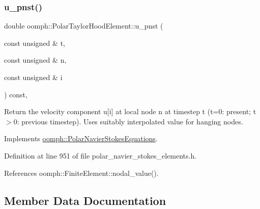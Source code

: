 \mbox{\label{classoomph_1_1PolarTaylorHoodElement_ad1faa74e287808e3a2ebc493d6e78686}} 
\subsubsection{\texorpdfstring{u\+\_\+pnst()}{u\_pnst()}\hspace{0.1cm}{\footnotesize\ttfamily [2/2]}}
{\footnotesize\ttfamily double oomph\+::\+Polar\+Taylor\+Hood\+Element\+::u\+\_\+pnst (\begin{DoxyParamCaption}\item[{const unsigned \&}]{t,  }\item[{const unsigned \&}]{n,  }\item[{const unsigned \&}]{i }\end{DoxyParamCaption}) const\hspace{0.3cm}{\ttfamily [inline]}, {\ttfamily [virtual]}}



Return the velocity component u\mbox{[}i\mbox{]} at local node n at timestep t (t=0\+: present; t$>$0\+: previous timestep). Uses suitably interpolated value for hanging nodes. 



Implements \hyperlink{classoomph_1_1PolarNavierStokesEquations_ace9bb9807c722cd910ed54891df7d58c}{oomph\+::\+Polar\+Navier\+Stokes\+Equations}.



Definition at line 951 of file polar\+\_\+navier\+\_\+stokes\+\_\+elements.\+h.



References oomph\+::\+Finite\+Element\+::nodal\+\_\+value().



\subsection{Member Data Documentation}
\mbox{\label{classoomph_1_1PolarTaylorHoodElement_a4db1fda841168bbf5889e060b52f4344}} 

